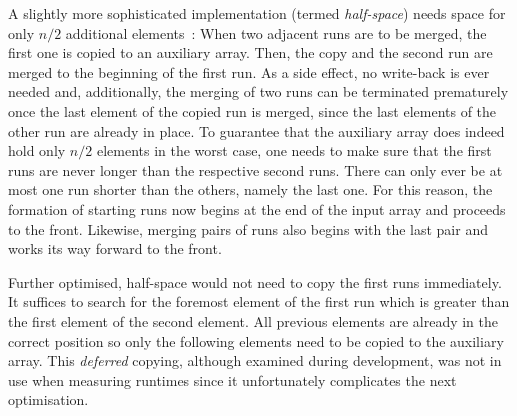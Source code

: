 A slightly more sophisticated implementation (termed \emph{half-space}) needs space for only \(n/2\) additional elements~\cite[Section~2.5]{lang2009algorithmen}:
When two adjacent runs are to be merged, the first one is copied to an auxiliary array.
Then, the copy and the second run are merged to the beginning of the first run.
As a side effect, no write-back is ever needed and, additionally, the merging of two runs can be terminated prematurely once the last element of the copied run is merged, since the last elements of the other run are already in place.
To guarantee that the auxiliary array does indeed hold only \(n/2\) elements in the worst case, one needs to make sure that the first runs are never longer than the respective second runs.
There can only ever be at most one run shorter than the others, namely the last one.
For this reason, the formation of starting runs now begins at the end of the input array and proceeds to the front.
Likewise, merging pairs of runs also begins with the last pair and works its way forward to the front.

Further optimised, half-space \MS{} would not need to copy the first runs immediately.
It suffices to search for the foremost element of the first run which is greater than the first element of the second element.
All previous elements are already in the correct position so only the following elements need to be copied to the auxiliary array.
This \emph{deferred} copying, although examined during development, was not in use when measuring runtimes since it unfortunately complicates the next optimisation.


